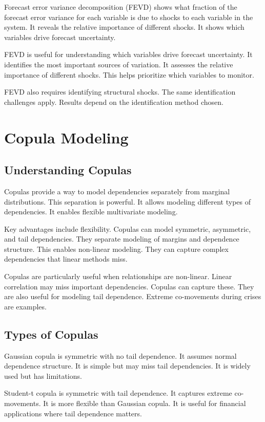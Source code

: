 Forecast error variance decomposition (FEVD) shows what fraction of the forecast error variance for each variable is due to shocks to each variable in the system. It reveals the relative importance of different shocks. It shows which variables drive forecast uncertainty.

FEVD is useful for understanding which variables drive forecast uncertainty. It identifies the most important sources of variation. It assesses the relative importance of different shocks. This helps prioritize which variables to monitor.

FEVD also requires identifying structural shocks. The same identification challenges apply. Results depend on the identification method chosen.

\section{Copula Modeling}

\subsection{Understanding Copulas}

Copulas provide a way to model dependencies separately from marginal distributions. This separation is powerful. It allows modeling different types of dependencies. It enables flexible multivariate modeling.

Key advantages include flexibility. Copulas can model symmetric, asymmetric, and tail dependencies. They separate modeling of margins and dependence structure. This enables non-linear modeling. They can capture complex dependencies that linear methods miss.

Copulas are particularly useful when relationships are non-linear. Linear correlation may miss important dependencies. Copulas can capture these. They are also useful for modeling tail dependence. Extreme co-movements during crises are examples.

\subsection{Types of Copulas}

Gaussian copula is symmetric with no tail dependence. It assumes normal dependence structure. It is simple but may miss tail dependencies. It is widely used but has limitations.

Student-t copula is symmetric with tail dependence. It captures extreme co-movements. It is more flexible than Gaussian copula. It is useful for financial applications where tail dependence matters.

